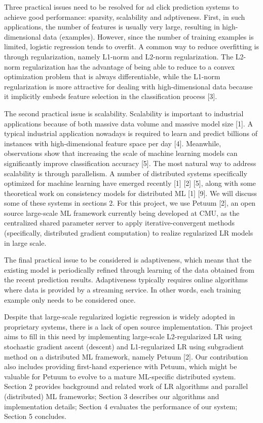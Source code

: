 \documentclass{article} %
\begin{document}
Three practical issues need to be resolved for ad click prediction systems to achieve good performance: sparsity, scalability and adptiveness. First, in such applications, the number of features is usually very large, resulting in high-dimensional data (examples). However, since the number of training examples is limited, logistic regression tends to overfit. A common way to reduce overfitting is through regularization, namely L1-norm and L2-norm regularization. The L2-norm regularization has the advantage of being able to reduce to a convex optimization problem that is always differentiable, while the L1-norm regularization is more attractive for dealing with high-dimensional data because it implicitly embeds feature selection in the classification process [3].

The second practical issue is scalability. Scalability is important to industrial applications because of both massive data volume and massive model size [1]. A typical industrial application nowadays is required to learn and predict billions of instances with high-dimensional feature space per day [4]. Meanwhile, observations show that increasing the scale of machine learning models can significantly improve classification accuracy [5]. The most natural way to address scalability is through parallelism. A number of distributed systems specifically optimized for machine learning have emerged recently [1] [2] [5], along with some theoretical work on consistency models for distributed ML [1] [9]. We will discuss some of these systems in sections 2. For this project, we use Petuum [2], an open source large-scale ML framework currently being developed at CMU, as the centralized shared parameter server to apply iterative-convergent methods (specifically, distributed gradient computation) to realize regularized LR models in large scale.

The final practical issue to be considered is adaptiveness, which means that the existing model is periodically refined through learning of the data obtained from the recent prediction results. Adaptiveness typically requires online algorithms where data is provided by a streaming service. In other words, each training example only needs to be considered once.

Despite that large-scale regularized logistic regression is widely adopted in proprietary systems, there is a lack of open source implementation. This project aims to fill in this need by implementing large-scale L2-regularized LR using stochastic gradient ascent (descent) and L1-regularized LR using subgradient method on a distributed ML framework, namely Petuum [2]. Our contribution also includes providing first-hand experience with Petuum, which might be valuable for Petuum to evolve to a mature ML-specific distributed system. Section 2 provides background and related work of LR algorithms and parallel (distributed) ML frameworks; Section 3 describes our algorithms and implementation details; Section 4 evaluates the performance of our system; Section 5 concludes. 
\end{document}
